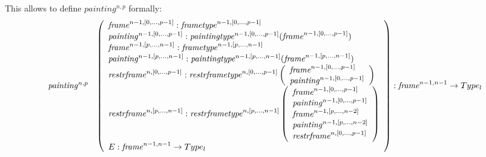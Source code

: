 \documentclass{article}
\newcommand{\myframe}{\mathit{frame}}
\newcommand{\myframetype}{\mathit{frametype}}
\newcommand{\painting}{\mathit{painting}}
\newcommand{\paintingtype}{\mathit{paintingtype}}
\newcommand{\restrframe}{\mathit{restrframe}}
\newcommand{\restrframetype}{\mathit{restrframetype}}
\begin{document}
\begin{enumerate}
        This allows to define $\painting^{n,p}$ formally:
        $$
          \begin{array}{llcl}
            \painting^{n,p}                                     &
            \multicolumn{3}{l}{
              \left(\begin{array}{l}
                        \myframe^{n-1,[0,...,p-1]}:\myframetype^{n-1,[0,...,p-1]}                               \\
                        \painting^{n-1,[0,...,p-1]}:\paintingtype^{n-1,[0,...,p-1]}(\myframe^{n-1,[0,...,p-1]}) \\
                        \myframe^{n-1,[p,...,n-1]}:\myframetype^{n-1,[p,...,n-1]}                                     \\
                        \painting^{n-1,[p,...,n-1]}:\paintingtype^{n-1,[p,...,n-1]}(\myframe^{n-1,[p,...,n-1]})           \\
                        \restrframe^{n,[0,...,p-1]}:\restrframetype^{n,[0,...,p-1]}
                                \left(\begin{array}{l}
                                    \myframe^{n-1,[0,...,p-1]}  \\
                                    \painting^{n-1,[0,...,p-1]} \\
                                  \end{array}\right) \\
                        \restrframe^{n,[p,...,n-1]}:\restrframetype^{n,[p,...,n-1]}
                                \left(\begin{array}{l}
                                    \myframe^{n-1,[0,...,p-1]}  \\
                                    \painting^{n-1,[0,...,p-1]} \\
                                    \myframe^{n-1,[p,...,n-2]}  \\
                                    \painting^{n-1,[p,...,n-2]} \\
                                    \restrframe^{n,[0,...,p-1]} \\
                                  \end{array}\right) \\
                        E:\myframe^{n-1,n-1}\rightarrow Type_l\\
                      \end{array}\right) : \myframe^{n-1,n-1}\rightarrow Type_l
            }    \\

\end{array}$$
\end{enumerate}
\end{document}
